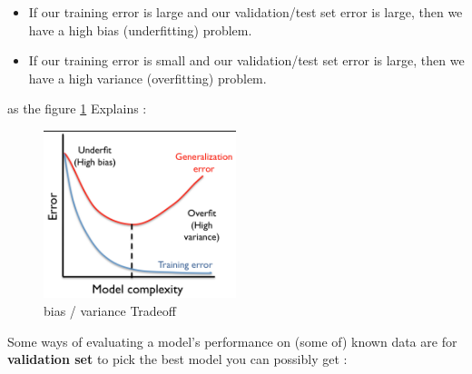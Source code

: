 \begin{itemize}
\item If our training error is large and our validation/test set error is large, then we have a high bias (underfitting) problem.
\item If our training error is small and our validation/test set error is large, then we have a high variance (overfitting) problem.
\end{itemize}

as the figure \ref{fig:bias} Explains : 

\begin{figure}[H]
\centering
\includegraphics[width=0.5\textwidth]{img/model.png}
\caption{ bias / variance Tradeoff}
\label{fig:bias}
\end{figure}

Some ways of evaluating a model's performance on (some of)  known data are for \textbf{validation set } to pick  the best model you can possibly get :

